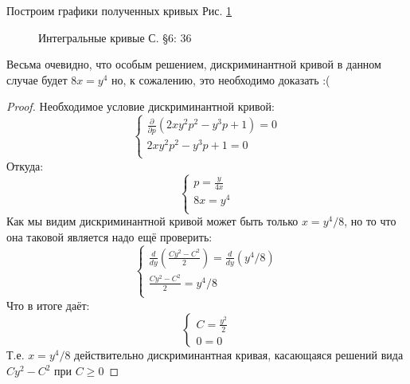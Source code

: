 \documentclass{article}
\begin{document}
Построим графики полученных кривых Рис. \ref{fig:6.36}
\begin{figure}[ht]
\caption{Интегральные кривые С. \S6: 36}
\label{fig:6.36}
\end{figure}
\newline
Весьма очевидно, что особым решением, дискриминантной кривой в данном случае будет $8x=y^4$ но, к сожалению, это необходимо доказать :(
\begin{proof}
Необходимое условие дискриминантной кривой:
\begin{equation}
    \begin{cases}
    \frac{\partial}{\partial p}(2 x y^2 p^2 - y^3 p + 1) = 0\\
    2 x y^2 p^2 - y^3 p + 1 = 0\\
    \end{cases}
\end{equation}
Откуда:
\begin{equation}
    \begin{cases}
    p=\frac{y}{4 x}\\
    8x=y^4\\
    \end{cases}
\end{equation}
Как мы видим дискриминантной кривой может быть только $x=y^4/8$, но то что она таковой является надо ещё проверить:
\begin{equation}
    \begin{cases}
    \frac{d}{d y}(\frac{C y^2 - C^2}{2})=\frac{d}{d y}(y^4/8)\\
    \frac{C y^2 - C^2}{2}=y^4/8\\
    \end{cases}
\end{equation}
Что в итоге даёт:
\begin{equation}
    \begin{cases}
    C=\frac{y^2}{2}\\
    0=0
    \end{cases}
\end{equation}
Т.е. $x=y^4/8$ действительно дискриминантная кривая, касающаяся решений  вида $C y^2 - C^2$ при $C \geq 0$
\end{proof}
\end{document}
